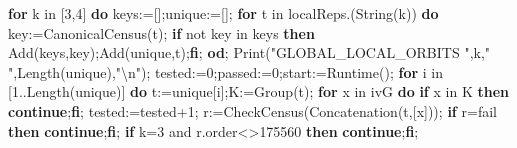 \documentclass[
  10pt,
  letterpaper,
]{article}
\newenvironment{Shaded}{}{}
\newcommand{\BuiltInTok}[1]{\textcolor[rgb]{0.00,0.50,0.00}{#1}}
\newcommand{\ConstantTok}[1]{\textcolor[rgb]{0.53,0.00,0.00}{#1}}
\newcommand{\ControlFlowTok}[1]{\textcolor[rgb]{0.00,0.44,0.13}{\textbf{#1}}}
\newcommand{\ExtensionTok}[1]{#1}
\newcommand{\FloatTok}[1]{\textcolor[rgb]{0.25,0.63,0.44}{#1}}
\newcommand{\NormalTok}[1]{#1}
\newcommand{\OperatorTok}[1]{\textcolor[rgb]{0.40,0.40,0.40}{#1}}
\newcommand{\StringTok}[1]{\textcolor[rgb]{0.25,0.44,0.63}{#1}}
\newcommand{\VariableTok}[1]{\textcolor[rgb]{0.10,0.09,0.49}{#1}}
\begin{document}
\begin{Shaded}
\begin{Highlighting}[]
\ControlFlowTok{for} \VariableTok{k} \ExtensionTok{in}\NormalTok{ [}\FloatTok{3}\OperatorTok{,}\FloatTok{4}\NormalTok{] }\ControlFlowTok{do}
 \VariableTok{keys}\OperatorTok{:=}\NormalTok{[]}\OperatorTok{;}\VariableTok{unique}\OperatorTok{:=}\NormalTok{[]}\OperatorTok{;}
 \ControlFlowTok{for} \VariableTok{t} \ExtensionTok{in} \VariableTok{localReps}\NormalTok{.(}\BuiltInTok{String}\NormalTok{(}\VariableTok{k}\NormalTok{)) }\ControlFlowTok{do}
  \VariableTok{key}\OperatorTok{:=}\VariableTok{CanonicalCensus}\NormalTok{(}\VariableTok{t}\NormalTok{)}\OperatorTok{;}
  \ControlFlowTok{if} \ConstantTok{not} \VariableTok{key} \ExtensionTok{in} \VariableTok{keys} \ControlFlowTok{then} \BuiltInTok{Add}\NormalTok{(}\VariableTok{keys}\OperatorTok{,}\VariableTok{key}\NormalTok{)}\OperatorTok{;}\BuiltInTok{Add}\NormalTok{(}\VariableTok{unique}\OperatorTok{,}\VariableTok{t}\NormalTok{)}\OperatorTok{;}\ControlFlowTok{fi}\OperatorTok{;}
 \ControlFlowTok{od}\OperatorTok{;}
 \BuiltInTok{Print}\NormalTok{(}\StringTok{"GLOBAL\_LOCAL\_ORBITS "}\OperatorTok{,}\VariableTok{k}\OperatorTok{,}\StringTok{" "}\OperatorTok{,}\BuiltInTok{Length}\NormalTok{(}\VariableTok{unique}\NormalTok{)}\OperatorTok{,}\StringTok{"\textbackslash{}n"}\NormalTok{)}\OperatorTok{;}
 \VariableTok{tested}\OperatorTok{:=}\FloatTok{0}\OperatorTok{;}\VariableTok{passed}\OperatorTok{:=}\FloatTok{0}\OperatorTok{;}\VariableTok{start}\OperatorTok{:=}\BuiltInTok{Runtime}\NormalTok{()}\OperatorTok{;}
 \ControlFlowTok{for} \VariableTok{i} \ExtensionTok{in}\NormalTok{ [}\FloatTok{1}\OperatorTok{..}\BuiltInTok{Length}\NormalTok{(}\VariableTok{unique}\NormalTok{)] }\ControlFlowTok{do}
  \VariableTok{t}\OperatorTok{:=}\VariableTok{unique}\NormalTok{[}\VariableTok{i}\NormalTok{]}\OperatorTok{;}\VariableTok{K}\OperatorTok{:=}\BuiltInTok{Group}\NormalTok{(}\VariableTok{t}\NormalTok{)}\OperatorTok{;}
  \ControlFlowTok{for} \VariableTok{x} \ExtensionTok{in} \VariableTok{ivG} \ControlFlowTok{do}
   \ControlFlowTok{if} \VariableTok{x} \ExtensionTok{in} \VariableTok{K} \ControlFlowTok{then} \ControlFlowTok{continue}\OperatorTok{;}\ControlFlowTok{fi}\OperatorTok{;}
   \VariableTok{tested}\OperatorTok{:=}\VariableTok{tested}\OperatorTok{+}\FloatTok{1}\OperatorTok{;}
   \VariableTok{r}\OperatorTok{:=}\VariableTok{CheckCensus}\NormalTok{(}\BuiltInTok{Concatenation}\NormalTok{(}\VariableTok{t}\OperatorTok{,}\NormalTok{[}\VariableTok{x}\NormalTok{]))}\OperatorTok{;}
   \ControlFlowTok{if} \VariableTok{r}\OperatorTok{=}\ConstantTok{fail} \ControlFlowTok{then} \ControlFlowTok{continue}\OperatorTok{;}\ControlFlowTok{fi}\OperatorTok{;}
   \ControlFlowTok{if} \VariableTok{k}\OperatorTok{=}\FloatTok{3} \ConstantTok{and} \VariableTok{r}\NormalTok{.}\VariableTok{order}\OperatorTok{\textless{}\textgreater{}}\FloatTok{175560} \ControlFlowTok{then} \ControlFlowTok{continue}\OperatorTok{;}\ControlFlowTok{fi}\OperatorTok{;}

\end{Highlighting}
\end{Shaded}
\end{document}
